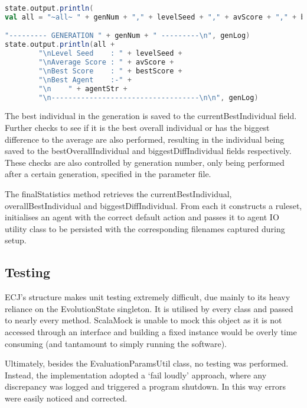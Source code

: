 \begin{minipage}{0.9\linewidth}
\centering
\begin{lstlisting}[language=scala]
state.output.println(
val all = "~all~ " + genNum + "," + levelSeed + "," + avScore + "," + bestScore

"--------- GENERATION " + genNum + " ---------\n", genLog)
state.output.println(all + 
        "\nLevel Seed    : " + levelSeed + 
        "\nAverage Score : " + avScore + 
        "\nBest Score    : " + bestScore + 
        "\nBest Agent    :-" +
        "\n    " + agentStr + 
        "\n-----------------------------------\n\n", genLog)
\end{lstlisting}
\end{minipage}
 
The best individual in the generation is saved to the currentBestIndividual field. Further checks to see if it is the best overall individual or has the biggest difference to the average are also performed, resulting in the individual being saved to the bestOverallIndividual and biggestDiffIndividual fields respectively. These checks are also controlled by generation number, only being performed after a certain generation, specified in the parameter file.

The finalStatistics method retrieves the current\-Best\-Individual, overall\-Best\-Individual and biggest\-Diff\-Individual. From each it constructs a ruleset, initialises an agent with the correct default action and passes it to agent IO utility class to be persisted with the corresponding filenames captured during setup.



\subsection{Testing}

ECJ's structure makes unit testing extremely difficult, due mainly to its heavy reliance on the EvolutionState singleton. It is utilised by every class and passed to nearly every method. ScalaMock is unable to mock this object as it is not accessed through an interface and building a fixed instance would be overly time consuming (and tantamount to simply running the software).

Ultimately, besides the EvaluationParamsUtil class, no testing was performed. Instead, the implementation adopted a `fail loudly' approach, where any discrepancy was logged and triggered a program shutdown. In this way errors were easily noticed and corrected.

